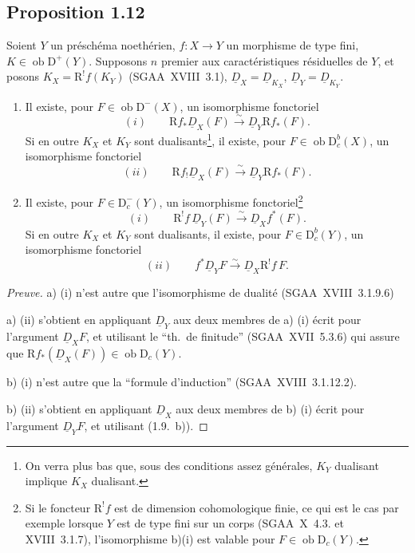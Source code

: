 \documentclass[11pt]{article}
\newcommand{\R}{\mathrm{R}}
\newcommand{\D}{\mathrm{D}}
\newcommand{\ob}{\operatorname{ob}}
\providecommand{\ob}{\operatorname{ob}}
\providecommand{\R}{\mathrm R}
\begin{document}
\subsection*{Proposition 1.12}
Soient $Y$ un préschéma noethérien, $f : X \to Y$ un morphisme de type fini, $K \in \ob \D^{+}(Y)$. Supposons $n$ premier aux caractéristiques résiduelles de $Y$, et posons $K_X = \R^{!}f(K_Y)$ (SGAA~XVIII~3.1), $\underline{D}_X = \underline{D}_{K_X}$, $\underline{D}_Y = \underline{D}_{K_Y}$.
\begin{enumerate}
\item[a)] Il existe, pour $F \in \ob \D^{-}(X)$, un isomorphisme fonctoriel
\[
(i) \qquad \R f_{*} \underline{D}_X(F) \xrightarrow{\sim} \underline{D}_Y \R f_{*}(F).
\]
Si en outre $K_X$ et $K_Y$ sont dualisants\footnote{On verra plus bas que, sous des conditions assez générales, $K_Y$ dualisant implique $K_X$ dualisant.}, il existe, pour $F \in \ob \D_c^{b}(X)$, un isomorphisme fonctoriel
\[
(ii) \qquad \R f_{!} \underline{D}_X(F) \xrightarrow{\sim} \underline{D}_Y \R f_{*}(F).
\]
\item[b)] Il existe, pour $F \in \D_c^{-}(Y)$, un isomorphisme fonctoriel\footnote{Si le foncteur $\R^{!}f$ est de dimension cohomologique finie, ce qui est le cas par exemple lorsque $Y$ est de type fini sur un corps (SGAA~X~4.3. et XVIII~3.1.7), l'isomorphisme b)(i) est valable pour $F \in \ob \D_c(Y)$.}
\[
(i) \qquad \R^{!}f \, \underline{D}_Y(F) \xrightarrow{\sim} \underline{D}_X f^{*}(F).
\]
Si en outre $K_X$ et $K_Y$ sont dualisants\footnotemark[3], il existe, pour $F \in \D_c^{b}(Y)$, un isomorphisme fonctoriel
\[
(ii) \qquad f^{*} \underline{D}_Y F \xrightarrow{\sim} \underline{D}_X \R^{!}f \, F.
\]
\end{enumerate}

\begin{proof}[Preuve]
a) (i) n'est autre que l'isomorphisme de dualité (SGAA~XVIII~3.1.9.6)

a) (ii) s'obtient en appliquant $\underline{D}_Y$ aux deux membres de a) (i) écrit pour l'argument $\underline{D}_X F$, et utilisant le ``th.~de finitude'' (SGAA~XVII~5.3.6) qui assure que $\R f_{*}(\underline{D}_X(F)) \in \ob \D_c(Y)$.

b) (i) n'est autre que la ``formule d'induction'' (SGAA~XVIII~3.1.12.2).

b) (ii) s'obtient en appliquant $\underline{D}_X$ aux deux membres de b) (i) écrit pour l'argument $\underline{D}_Y F$, et utilisant (1.9.~b)).
\end{proof}
\end{document}
